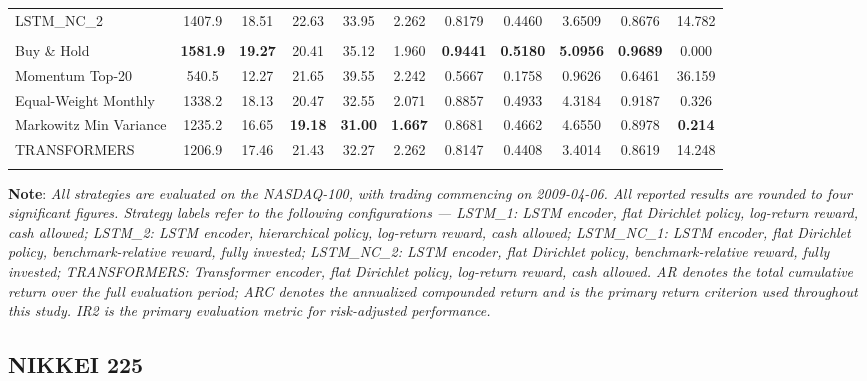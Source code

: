 \documentclass[]{elsarticle}
\begin{document}
\begin{table}[htbp]
{\begin{tabular}{lcccccccccc}
LSTM\_NC\_2 & 1407.9 & 18.51 & 22.63 & 33.95 & 2.262 & 0.8179 & 0.4460 & 3.6509 & 0.8676 & 14.782 \\
\addlinespace
\multicolumn{11}{l}{\textbf{Panel C: RL with Transformers}} \\
\midrule
Buy \& Hold & \textbf{1581.9} & \textbf{19.27} & 20.41 & 35.12 & 1.960 & \textbf{0.9441} & \textbf{0.5180} & \textbf{5.0956} & \textbf{0.9689} & 0.000 \\
Momentum Top-20 & 540.5 & 12.27 & 21.65 & 39.55 & 2.242 & 0.5667 & 0.1758 & 0.9626 & 0.6461 & 36.159 \\
Equal-Weight Monthly & 1338.2 & 18.13 & 20.47 & 32.55 & 2.071 & 0.8857 & 0.4933 & 4.3184 & 0.9187 & 0.326 \\
Markowitz Min Variance & 1235.2 & 16.65 & \textbf{19.18} & \textbf{31.00} & \textbf{1.667} & 0.8681 & 0.4662 & 4.6550 & 0.8978 & \textbf{0.214} \\
TRANSFORMERS & 1206.9 & 17.46 & 21.43 & 32.27 & 2.262 & 0.8147 & 0.4408 & 3.4014 & 0.8619 & 14.248 \\
\addlinespace
\bottomrule
\end{tabular}%
}
\end{table}

\vspace{-0.4cm}
\noindent\linespread{0.65}\selectfont
{\scriptsize \textbf{Note}: \textit{All strategies are evaluated on the NASDAQ-100, with trading commencing on 2009-04-06. All reported results are rounded to four significant figures. Strategy labels refer to the following configurations --- LSTM\_1: LSTM encoder, flat Dirichlet policy, log-return reward, cash allowed; LSTM\_2: LSTM encoder, hierarchical policy, log-return reward, cash allowed; LSTM\_NC\_1: LSTM encoder, flat Dirichlet policy, benchmark-relative reward, fully invested; LSTM\_NC\_2: LSTM encoder, flat Dirichlet policy, benchmark-relative reward, fully invested; TRANSFORMERS: Transformer encoder, flat Dirichlet policy, log-return reward, cash allowed. AR denotes the total cumulative return over the full evaluation period; ARC denotes the annualized compounded return and is the primary return criterion used throughout this study. IR2 is the primary evaluation metric for risk-adjusted performance.}}

\linespread{1.5}\selectfont

\hypertarget{er_NKSY}{%
\subsection{NIKKEI 225}\label{er_NKSY}}
\end{document}
